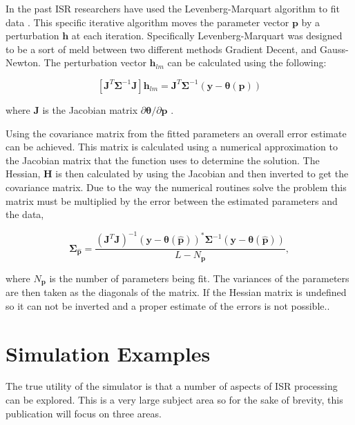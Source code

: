 \documentclass[draft,ras]{agutex}
\begin{document}
\begin{article}

In the past ISR researchers have used the Levenberg-Marquart algorithm to fit data \citep{nikoukar2008}.  This specific iterative algorithm moves the parameter vector $\mathbf{p}$ by a perturbation $\mathbf{h}$ at each iteration\citep{gavin:2013}.  Specifically Levenberg-Marquart was designed to be a sort of meld between two different methods Gradient Decent, and Gauss-Newton.  The perturbation vector $\mathbf{h}_{lm}$ can be calculated using the following:

\begin{equation}
\left[ \mathbf{J}^T\bm{\Sigma}^{-1}\mathbf{J}\right]\mathbf{h}_{lm} =\mathbf{J}^T\bm{\Sigma}^{-1}(\mathbf{y}-\bm{\theta}(\mathbf{p}))
\label{hlm}
\end{equation}

\noindent where $\mathbf{J}$ is the Jacobian matrix $\partial \bm{\theta}/\partial \mathbf{p}$ \citep{levenberg1944,marquardt:1963}. 

Using the covariance matrix from the fitted parameters an overall error estimate can be achieved. This matrix is calculated using a numerical approximation to the Jacobian matrix that the function uses to determine the solution. The Hessian, $\mathbf{H}$ is then calculated by using the Jacobian and then inverted to get the covariance matrix. Due to the way the numerical routines solve the problem this matrix must be multiplied by the error between the estimated parameters and the data,

\begin{equation}
\label{eqn:jacinv}
\bm{\Sigma}_{\hat{\mathbf{p}}}=\frac{(\mathbf{J}^T\mathbf{J})^{-1} (\mathbf{y}-\bm{\theta}(\hat{\mathbf{p}}))^*\bm{\Sigma}^{-1}(\mathbf{y}-\bm{\theta}(\hat{\mathbf{p}}))}{L-N_{\mathbf{p}}},
\end{equation}

\noindent where $N_{\mathbf{p}}$ is the number of parameters being fit. The variances of the parameters are then taken as the diagonals of the matrix. If the Hessian matrix is undefined so it can not be inverted and a proper estimate of the errors is not possible..

\section{Simulation Examples}
The true utility of the simulator is that a number of aspects of ISR processing can be explored. This is a very large subject area so for the sake of brevity, this publication will focus on three areas.  


\end{article}
\end{document}
